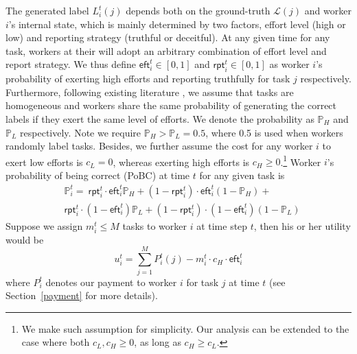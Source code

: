The generated label $L^{t}_{i}(j)$ depends both on the ground-truth $\mathcal{L}(j)$ and worker $i$'s internal state, which is mainly determined by two factors, effort level (high or low) and reporting strategy (truthful or deceitful).
At any given time for any task, workers at their will adopt an arbitrary combination of effort level and report strategy. We thus define $\textsf{eft}^{t}_i\in[0,1]$ and $\textsf{rpt}^{t}_i\in[0,1]$ as worker $i$'s probability of exerting high efforts and reporting truthfully for task $j$ %
respectively. Furthermore, following existing literature \citet{dasgupta2013crowdsourced,liu2017sequential}, we assume that tasks are homogeneous and workers share the same probability of generating the correct labels if they exert the same level of efforts. We denote the probability as $\mathbb{P}_{H}$ and $\mathbb{P}_{L}$ respectively. Note we require $\mathbb{P}_{H} > \mathbb{P}_{L} = 0.5$, where 0.5 is used when workers randomly label tasks.
Besides, we further assume the cost for any worker $i$ to exert low efforts is $c_{L} = 0$, whereas exerting high efforts is $c_{H} \geq 0$.\footnote{We make such assumption for simplicity. Our analysis can be extended to the case where both $c_{L},  c_{H} \geq 0$, as long as $c_{H} \geq c_{L}$.}
Worker $i$'s probability of being correct (PoBC) at time $t$ for any given task is
\begin{equation}
\begin{split}
&\mathbb{P}^{t}_i  = ~\textsf{rpt}^{t}_i \cdot\textsf{eft}^{t}_i \mathbb{P}_{H}+ (1-\textsf{rpt}^{t}_i)\cdot \textsf{eft}^{t}_i (1-\mathbb{P}_{ H})+\\
&\textsf{rpt}^{t}_i \cdot(1-\textsf{eft}^{t}_i) \mathbb{P}_{L}+(1-\textsf{rpt}^{t}_i) \cdot(1-\textsf{eft}^{t}_i) (1-\mathbb{P}_{L})
\end{split}
\end{equation}
Suppose we assign $m^{t}_i\leq M$ tasks to worker $i$ at time step $t$, then his or her utility would be 
\begin{equation}
\label{equation:u_of_worker}
u_i^t={\sum}_{j=1}^{M}P_i^t(j) - m^{t}_i \cdot c_H\cdot \textsf{eft}^{t}_i
\end{equation}
where $P^{t}_{i}$ denotes our payment to worker $i$ for task $j$ at time $t$ (see Section~\ref{payment} for more details).

